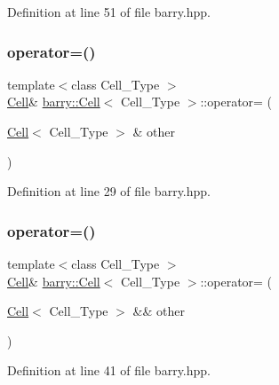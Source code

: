 Definition at line 51 of file barry.\+hpp.

\mbox{\label{classbarry_1_1_cell_a2a23ba83119de9162b6e3b6a994f4b61}} 
\subsubsection{\texorpdfstring{operator=()}{operator=()}\hspace{0.1cm}{\footnotesize\ttfamily [1/2]}}
{\footnotesize\ttfamily template$<$class Cell\+\_\+\+Type $>$ \\
\hyperlink{classbarry_1_1_cell}{Cell}\& \hyperlink{classbarry_1_1_cell}{barry\+::\+Cell}$<$ Cell\+\_\+\+Type $>$\+::operator= (\begin{DoxyParamCaption}\item[{\hyperlink{classbarry_1_1_cell}{Cell}$<$ Cell\+\_\+\+Type $>$ \&}]{other }\end{DoxyParamCaption})\hspace{0.3cm}{\ttfamily [inline]}}



Definition at line 29 of file barry.\+hpp.

\mbox{\label{classbarry_1_1_cell_ac0f00c52254617f8e4ba9d03ddf5b890}} 
\subsubsection{\texorpdfstring{operator=()}{operator=()}\hspace{0.1cm}{\footnotesize\ttfamily [2/2]}}
{\footnotesize\ttfamily template$<$class Cell\+\_\+\+Type $>$ \\
\hyperlink{classbarry_1_1_cell}{Cell}\& \hyperlink{classbarry_1_1_cell}{barry\+::\+Cell}$<$ Cell\+\_\+\+Type $>$\+::operator= (\begin{DoxyParamCaption}\item[{\hyperlink{classbarry_1_1_cell}{Cell}$<$ Cell\+\_\+\+Type $>$ \&\&}]{other }\end{DoxyParamCaption})\hspace{0.3cm}{\ttfamily [inline]}}



Definition at line 41 of file barry.\+hpp.



